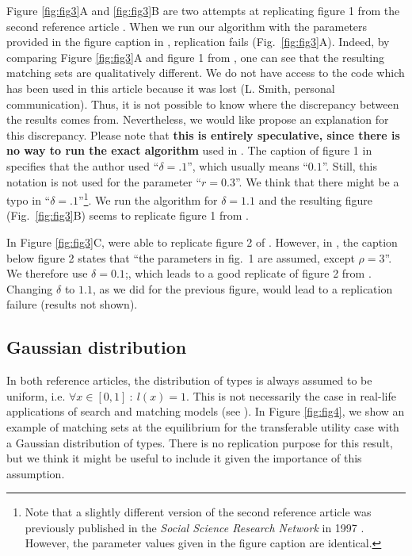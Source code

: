 Figure \ref{fig:fig3}A and \ref{fig:fig3}B are two attempts at replicating figure 1 from the second reference article \citep{smith_marriage_2006}. When we run our algorithm with the parameters provided in the figure caption in \citep{smith_marriage_2006}, replication fails (Fig.~\ref{fig:fig3}A). Indeed, by comparing Figure \ref{fig:fig3}A and figure 1 from \citep{smith_marriage_2006}, one can see that the resulting matching sets are qualitatively different. We do not have access to the code which has been used in this article because it was lost (L. Smith, personal communication). Thus, it is not possible to know where the discrepancy between the results comes from. Nevertheless, we would like propose an explanation for this discrepancy. Please note that \textbf{this is entirely speculative, since there is no way to run the exact algorithm} used in \citep{smith_marriage_2006}. The caption of figure 1 in \citep{smith_marriage_2006} specifies that the author used ``$\delta=.1$'', which usually means ``$0.1$''. Still, this notation is not used for the parameter ``$r=0.3$''. We think that there might be a typo in ``$\delta=.1$''\footnote{Note that a slightly different version of the second reference article \citep{smith_marriage_2006} was previously published in the \textit{Social Science Research Network} in 1997 \citep{smith_marriage_1997}. However, the parameter values given in the figure caption are identical.}. We run the algorithm for $\delta=1.1$ and the resulting figure (Fig.~\ref{fig:fig3}B) seems to replicate figure 1 from \citep{smith_marriage_2006}.

In Figure \ref{fig:fig3}C, were able to replicate figure 2 of \citep{smith_marriage_2006}. However, in \citep{smith_marriage_2006}, the caption below figure 2 states that ``the parameters in fig.~1 are assumed, except $\rho=3$''. We therefore use $\delta=0.1$;, which leads to a good replicate of figure 2 from \citep{smith_marriage_2006}. Changing $\delta$ to $1.1$, as we did for the previous figure, would lead to a replication failure (results not shown).


\subsection*{Gaussian distribution}

In both reference articles, the distribution of types is always assumed to be uniform, i.e. $\forall x \in [0,1] \ : \ l(x)=1$. This is not necessarily the case in real-life applications of search and matching models (see \citep{hagedorn_identifying_2017}). In Figure \ref{fig:fig4}, we show an example of matching sets at the equilibrium for the transferable utility case with a Gaussian distribution of types. There is no replication purpose for this result, but we think it might be useful to include it given the importance of this assumption.

